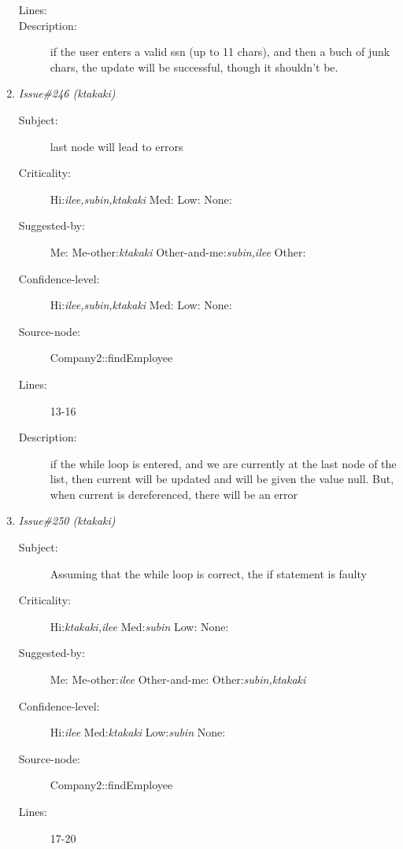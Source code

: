 \begin{enumerate}
\begin{description}
\item [Lines:] 

\item [Description:] if the user enters a valid ssn (up to 11
chars), and then a buch of junk chars, the update will be successful, though
it shouldn't be.
\end{description}
\item {\it Issue\#246 (ktakaki)}
\begin{description}
\item [Subject:] last node will lead to errors
\item [Criticality:] Hi:{\it ilee,subin,ktakaki} Med:{\it } Low:{\it } None:{\it }
\item [Suggested-by:] Me:{\it } Me-other:{\it ktakaki} Other-and-me:{\it subin,ilee} Other:{\it }
\item [Confidence-level:] Hi:{\it ilee,subin,ktakaki} Med:{\it } Low:{\it } None:{\it }
\item [Source-node:] Company2::findEmployee

\item [Lines:] 13-16

\item [Description:] if the while loop is entered, and we are 
currently at the last node of the list, then current will be updated and will
be given the value null.  But, when current is dereferenced, there will be an
error
\end{description}
\item {\it Issue\#250 (ktakaki)}
\begin{description}
\item [Subject:] Assuming that the while loop is correct, the if
statement is faulty
\item [Criticality:] Hi:{\it ktakaki,ilee} Med:{\it subin} Low:{\it } None:{\it }
\item [Suggested-by:] Me:{\it } Me-other:{\it ilee} Other-and-me:{\it } Other:{\it subin,ktakaki}
\item [Confidence-level:] Hi:{\it ilee} Med:{\it ktakaki} Low:{\it subin} None:{\it }
\item [Source-node:] Company2::findEmployee

\item [Lines:] 17-20


\end{description}
\end{enumerate}
